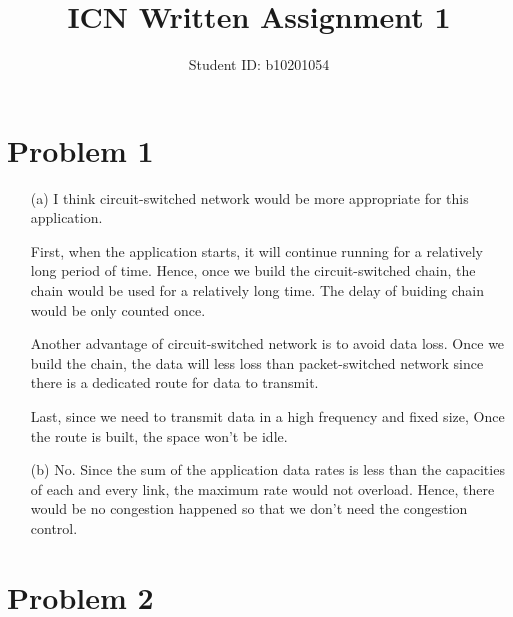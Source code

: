 \documentclass[12pt,a4paper]{article}
\title{ICN Written Assignment 1}
\author{Student ID: b10201054}
\begin{document}
\maketitle

\section*{Problem 1}

\begin{enumerate}
    \item [(a)] 
        I think circuit-switched network would be more appropriate for this application.

        First, when the application starts, it will continue running for a relatively long period of time. Hence, once we build the circuit-switched chain, the chain would be used for a relatively long time.
        The delay of buiding chain would be only counted once.

        Another advantage of circuit-switched network is to avoid data loss. Once we build the chain, the data will less loss than packet-switched network since there is a dedicated route for data to transmit.
        
        Last, since we need to transmit data in a high frequency and fixed size, Once the route is built, the space won't be idle.
        
    \item[(b)]
        No. Since the sum of the application data rates is less than the capacities of each and every link, the maximum rate would not overload.
        Hence, there would be no congestion happened so that we don't need the congestion control.
\end{enumerate}

\section*{Problem 2}    
\end{document}

